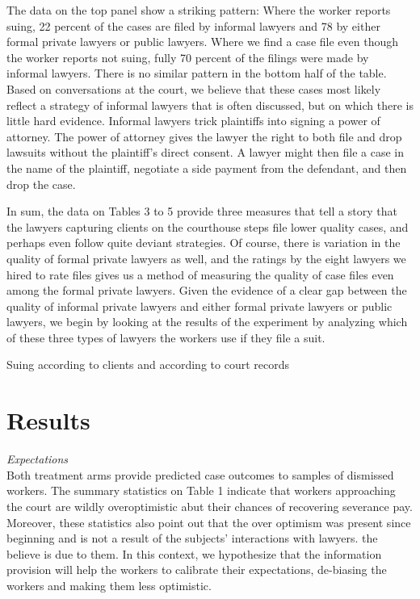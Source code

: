 \documentclass[12 pt]{article}
\begin{document}
The data on the top panel show a striking pattern: Where the worker reports suing, 22 percent of the cases are filed by informal lawyers and 78 by either formal private lawyers or public lawyers. Where we find a case file even though the worker reports not suing, fully 70 percent of the filings were made by informal lawyers. There is no similar pattern in the bottom half of the table. Based on conversations at the court, we believe that these cases most likely reflect a strategy of informal lawyers that is often discussed, but on which there is little hard evidence. Informal lawyers trick plaintiffs into signing a power of attorney. The power of attorney gives the lawyer the right to both file and drop lawsuits without the plaintiff’s direct consent. A lawyer might then file a case in the name of the plaintiff, negotiate a side payment from the defendant, and then drop the case. 

In sum, the data on Tables 3 to 5 provide three measures that tell a story that the lawyers capturing clients on the courthouse steps file lower quality cases, and perhaps even follow quite deviant strategies. Of course, there is variation in the quality of formal private lawyers as well, and the ratings by the eight lawyers we hired to rate files gives us a method of measuring the quality of case files even among the formal private lawyers. Given the evidence of a clear gap between the quality of informal private lawyers and either formal private lawyers or public lawyers, we begin by looking at the results of the experiment by analyzing which of these three types of lawyers the workers use if they file a suit. 
\\



\begin{table}[!ht]
    \caption{Suing according to clients and according to court records}
    \label{suing_clientsVSrecords}
    \center
    

  
\end{table}

\section{Results}

\emph{Expectations}\\
Both treatment arms provide predicted case outcomes to samples of dismissed workers. The summary statistics on Table 1 indicate that workers approaching the court are wildly overoptimistic abut their chances of recovering severance pay. Moreover, these statistics also point out that the over optimism was present since beginning and is not a result of the subjects’ interactions with lawyers. the believe is due to them. In this context, we hypothesize that the information provision will help the workers to calibrate their expectations, de-biasing the workers and making them less optimistic. 
\end{document}
